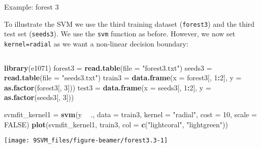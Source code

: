 \documentclass[10pt,ignorenonframetext,]{beamer}
\newenvironment{Shaded}{\begin{snugshade}}{\end{snugshade}}
\newcommand{\DataTypeTok}[1]{\textcolor[rgb]{0.13,0.29,0.53}{#1}}
\newcommand{\DecValTok}[1]{\textcolor[rgb]{0.00,0.00,0.81}{#1}}
\newcommand{\KeywordTok}[1]{\textcolor[rgb]{0.13,0.29,0.53}{\textbf{#1}}}
\newcommand{\NormalTok}[1]{#1}
\newcommand{\OperatorTok}[1]{\textcolor[rgb]{0.81,0.36,0.00}{\textbf{#1}}}
\newcommand{\OtherTok}[1]{\textcolor[rgb]{0.56,0.35,0.01}{#1}}
\newcommand{\StringTok}[1]{\textcolor[rgb]{0.31,0.60,0.02}{#1}}
\begin{document}
\begin{frame}[fragile]

\begin{block}{Example: forest 3}

\vspace{2mm}

To illustrate the SVM we use the third training dataset
(\texttt{forest3}) and the third test set (\texttt{seeds3}). We use the
\texttt{svm} function as before. However, we now set
\texttt{kernel=\textquotesingle{}radial\textquotesingle{}} as we want a
non-linear decision boundary:

\(~\)

\footnotesize

\begin{Shaded}
\begin{Highlighting}[]
\KeywordTok{library}\NormalTok{(e1071)}
\NormalTok{forest3 =}\StringTok{ }\KeywordTok{read.table}\NormalTok{(}\DataTypeTok{file =} \StringTok{"forest3.txt"}\NormalTok{)}
\NormalTok{seeds3 =}\StringTok{ }\KeywordTok{read.table}\NormalTok{(}\DataTypeTok{file =} \StringTok{"seeds3.txt"}\NormalTok{)}
\NormalTok{train3 =}\StringTok{ }\KeywordTok{data.frame}\NormalTok{(}\DataTypeTok{x =}\NormalTok{ forest3[, }\DecValTok{1}\OperatorTok{:}\DecValTok{2}\NormalTok{], }\DataTypeTok{y =} \KeywordTok{as.factor}\NormalTok{(forest3[, }\DecValTok{3}\NormalTok{]))}
\NormalTok{test3 =}\StringTok{ }\KeywordTok{data.frame}\NormalTok{(}\DataTypeTok{x =}\NormalTok{ seeds3[, }\DecValTok{1}\OperatorTok{:}\DecValTok{2}\NormalTok{], }\DataTypeTok{y =} \KeywordTok{as.factor}\NormalTok{(seeds3[, }\DecValTok{3}\NormalTok{]))}
\end{Highlighting}
\end{Shaded}

\end{block}

\end{frame}

\begin{frame}[fragile]

\scriptsize

\begin{Shaded}
\begin{Highlighting}[]
\NormalTok{svmfit_kernel1 =}\StringTok{ }\KeywordTok{svm}\NormalTok{(y }\OperatorTok{~}\StringTok{ }\NormalTok{., }\DataTypeTok{data =}\NormalTok{ train3, }\DataTypeTok{kernel =} \StringTok{"radial"}\NormalTok{, }\DataTypeTok{cost =} \DecValTok{10}\NormalTok{, }
    \DataTypeTok{scale =} \OtherTok{FALSE}\NormalTok{)}
\KeywordTok{plot}\NormalTok{(svmfit_kernel1, train3, }\DataTypeTok{col =} \KeywordTok{c}\NormalTok{(}\StringTok{"lightcoral"}\NormalTok{, }\StringTok{"lightgreen"}\NormalTok{))}
\end{Highlighting}
\end{Shaded}

\begin{center}\texttt{[image: 9SVM\_files/figure-beamer/forest3.3-1]} \end{center}

\end{frame}
\end{document}
